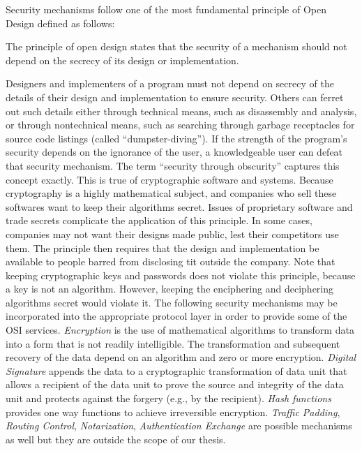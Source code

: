 	Security mechanisms follow one of the most fundamental principle of Open Design \cite{bishop2004introduction} defined as follows:
	\begin{definition}
		The principle of open design states that the security of a mechanism should not depend on the secrecy of its design or implementation.
		\label{def:open-design}
	\end{definition}
	Designers and implementers of a program must not depend on secrecy of the details of their design and implementation to ensure security.
	Others can ferret out such details either through technical means, such as disassembly and analysis, or through nontechnical means, such as searching through garbage receptacles for source code listings (called ``dumpster-diving'').
	If the strength of the program's security depends on the ignorance of the user, a knowledgeable user can defeat that security mechanism.
	The term ``security through obscurity'' captures this concept exactly.
	This is true of cryptographic software and systems.
	Because cryptography is a highly mathematical subject, and companies who sell these softwares want to keep their algorithms secret. 
	Issues of proprietary software and trade secrets complicate the application of this principle.
	In some cases, companies may not want their designs made public, lest their competitors use them.
	The principle then requires that the design and implementation be available to people barred from disclosing tit outside the company.
	Note that keeping cryptographic keys and passwords does not violate this principle, because a key is not an algorithm.
	However, keeping the enciphering and deciphering algorithms secret would violate it.
	The following security mechanisms may be incorporated into the appropriate protocol layer in order to provide some of the OSI services.
	\textit{Encryption} is the use of mathematical algorithms to transform data into a form that is not readily intelligible.
	The transformation and subsequent recovery of the data depend on an algorithm and zero or more encryption.
	\textit{Digital Signature} appends the data to a cryptographic transformation of data unit that allows a recipient of the data unit to prove the source and integrity of the data unit and protects against the forgery (e.g., by the recipient).
	\textit{Hash functions} provides one way functions to achieve irreversible encryption.
	\textit{Traffic Padding}, \textit{Routing Control}, \textit{Notarization}, \textit{Authentication Exchange} are possible mechanisms as well but they are outside the scope of our thesis.

